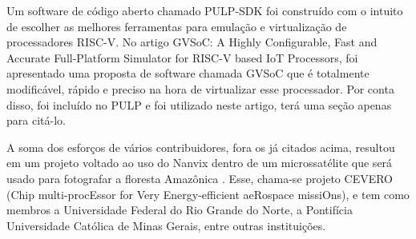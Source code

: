 Um software de código aberto chamado PULP-SDK foi construído com o intuito de escolher as melhores ferramentas para emulação e virtualização de processadores RISC-V. 
No artigo {GVSoC: A Highly Configurable, Fast and Accurate Full-Platform Simulator for RISC-V based IoT Processors}, foi apresentado uma proposta de software chamada
GVSoC que é totalmente modificável, rápido e preciso na hora de virtualizar esse processador. Por conta disso, foi incluído no PULP e foi utilizado neste artigo, terá
uma seção apenas para citá-lo.

A soma dos esforços de vários contribuidores, fora os já citados acima, resultou em um projeto voltado ao uso do Nanvix dentro de um microssatélite que será usado 
para fotografar a floresta Amazônica \cite{RepoCervero}. Esse, chama-se projeto CEVERO (Chip multi-procEssor for Very Energy-efficient aeRospace missiOns), e tem 
como membros a Universidade Federal do Rio Grande do Norte, a Pontifícia Universidade Católica de Minas Gerais, entre outras instituições. 
